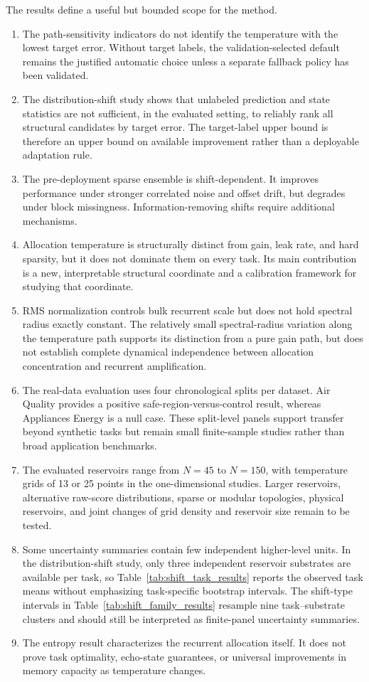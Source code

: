 \documentclass[preprint,12pt,authoryear]{elsarticle}
\begin{document}
The results define a useful but bounded scope for the method.
\begin{enumerate}[leftmargin=*]
  \item The path-sensitivity indicators do not identify the temperature with the lowest target error. Without target labels, the validation-selected default remains the justified automatic choice unless a separate fallback policy has been validated.
  \item The distribution-shift study shows that unlabeled prediction and state statistics are not sufficient, in the evaluated setting, to reliably rank all structural candidates by target error. The target-label upper bound is therefore an upper bound on available improvement rather than a deployable adaptation rule.
  \item The pre-deployment sparse ensemble is shift-dependent. It improves performance under stronger correlated noise and offset drift, but degrades under block missingness. Information-removing shifts require additional mechanisms.
  \item Allocation temperature is structurally distinct from gain, leak rate, and hard sparsity, but it does not dominate them on every task. Its main contribution is a new, interpretable structural coordinate and a calibration framework for studying that coordinate.
  \item RMS normalization controls bulk recurrent scale but does not hold spectral radius exactly constant. The relatively small spectral-radius variation along the temperature path supports its distinction from a pure gain path, but does not establish complete dynamical independence between allocation concentration and recurrent amplification.
  \item The real-data evaluation uses four chronological splits per dataset. Air Quality provides a positive safe-region-versus-control result, whereas Appliances Energy is a null case. These split-level panels support transfer beyond synthetic tasks but remain small finite-sample studies rather than broad application benchmarks.
  \item The evaluated reservoirs range from $N=45$ to $N=150$, with temperature grids of 13 or 25 points in the one-dimensional studies. Larger reservoirs, alternative raw-score distributions, sparse or modular topologies, physical reservoirs, and joint changes of grid density and reservoir size remain to be tested.
  \item Some uncertainty summaries contain few independent higher-level units. In the distribution-shift study, only three independent reservoir substrates are available per task, so Table~\ref{tab:shift_task_results} reports the observed task means without emphasizing task-specific bootstrap intervals. The shift-type intervals in Table~\ref{tab:shift_family_results} resample nine task--substrate clusters and should still be interpreted as finite-panel uncertainty summaries.
  \item The entropy result characterizes the recurrent allocation itself. It does not prove task optimality, echo-state guarantees, or universal improvements in memory capacity as temperature changes.
\end{enumerate}
\end{document}
